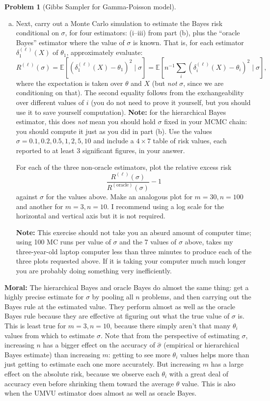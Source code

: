 \documentclass{article}
\newcommand{\EE}{\mathbb{E}}
\theoremstyle{definition}
\newtheorem{problem}{Problem}
\begin{document}
\begin{problem}[Gibbs Sampler for Gamma-Poisson model]
\begin{enumerate}[(a)]
\item Next, carry out a Monte Carlo simulation to estimate the Bayes risk conditional on $\sigma$, for four estimators: (i--iii) from part (b), plus the ``oracle Bayes'' estimator where the value of $\sigma$ is known. That is, for each estimator $\delta_1^{(\ell)}(X)$ of $\theta_1$, approximately evaluate:
\[
R^{(\ell)}(\sigma) = \EE[(\delta_1^{(\ell)}(X) - \theta_1)^2 \mid \sigma] = \EE\left[n^{-1}\sum_i(\delta_i^{(\ell)}(X) - \theta_i)^2 \mid \sigma\right],
\]
where the expectation is taken over $\theta$ and $X$ (but {\em not} $\sigma$, since we are conditioning on that). The second equality follows from the exchangeability over different values of $i$ (you do not need to prove it yourself, but you should use it to save yourself computation). {\bf Note:} for the hierarchical Bayes estimator, this does {\em not} mean you should hold $\sigma$ fixed in your MCMC chain: you should compute it just as you did in part (b). Use the values $\sigma = 0.1, 0.2, 0.5, 1, 2, 5, 10$ and include a $4\times 7$ table of risk values, each reported to at least 3 significant figures, in your answer.

For each of the three non-oracle estimators, plot the relative excess risk
\[
\frac{R^{(\ell)}(\sigma)}{R^{(\text{oracle})}(\sigma)} - 1
\]
against $\sigma$ for the values above. Make an analogous plot for $m = 30, n = 100$ and another for $m = 3, n = 10$. I recommend using a log scale for the horizontal and vertical axis but it is not required.

{\bf Note:} This exercise should not take you an absurd amount of computer time; using 100 MC runs per value of $\sigma$ and the 7 values of $\sigma$ above, takes my three-year-old laptop computer less than three minutes to produce each of the three plots requested above. If it is taking your computer much much longer you are probably doing something very inefficiently.



\end{enumerate}

{\bf Moral:} The hierarchical Bayes and oracle Bayes do almost the same thing: get a highly precise estimate for $\sigma$ by pooling all $n$ problems, and then carrying out the Bayes rule at the estimated value. They perform almost as well as the oracle Bayes rule because they are effective at figuring out what the true value of $\sigma$ is. This is least true for $m=3,n=10$, because there simply aren't that many $\theta_i$ values from which to estimate $\sigma$. Note that from the perspective of estimating $\sigma$, increasing $n$ has a bigger effect on the accuracy of $\hat\sigma$ (empirical or hierarchical Bayes estimate) than increasing $m$: getting to see more $\theta_i$ values helps more than just getting to estimate each one more accurately. But increasing $m$ has a large effect on the absolute risk, because we observe each $\theta_i$ with a great deal of accuracy even before shrinking them toward the average $\theta$ value. This is also when the UMVU estimator does almost as well as oracle Bayes.
\end{problem}



\end{document}
